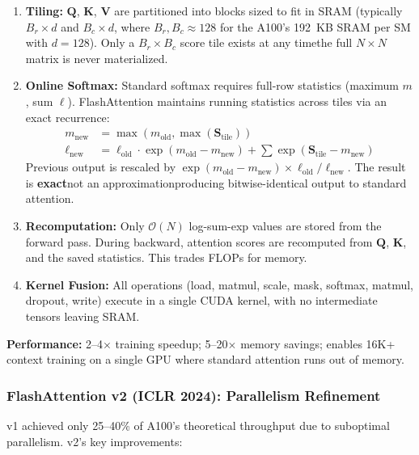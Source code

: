 \documentclass[11pt,a4paper]{article}
\begin{document}
\begin{enumerate}[leftmargin=*]
    \item \textbf{Tiling:} $\mathbf{Q}$, $\mathbf{K}$, $\mathbf{V}$ are partitioned into blocks sized to fit in SRAM (typically $B_r \times d$ and $B_c \times d$, where $B_r, B_c \approx 128$ for the A100's 192~KB SRAM per SM with $d = 128$). Only a $B_r \times B_c$ score tile exists at any time\textemdash the full $N \times N$ matrix is never materialized.

    \item \textbf{Online Softmax:} Standard softmax requires full-row statistics (maximum $m$, sum $\ell$). FlashAttention maintains running statistics across tiles via an exact recurrence:
    \begin{align*}
        m_{\text{new}} &= \max(m_{\text{old}}, \max(\mathbf{S}_{\text{tile}})) \\
        \ell_{\text{new}} &= \ell_{\text{old}} \cdot \exp(m_{\text{old}} - m_{\text{new}}) + \sum\exp(\mathbf{S}_{\text{tile}} - m_{\text{new}})
    \end{align*}
    Previous output is rescaled by $\exp(m_{\text{old}} - m_{\text{new}}) \times \ell_{\text{old}} / \ell_{\text{new}}$. The result is \textbf{exact}\textemdash not an approximation\textemdash producing bitwise-identical output to standard attention.

    \item \textbf{Recomputation:} Only $\mathcal{O}(N)$ log-sum-exp values are stored from the forward pass. During backward, attention scores are recomputed from $\mathbf{Q}$, $\mathbf{K}$, and the saved statistics. This trades FLOPs for memory.

    \item \textbf{Kernel Fusion:} All operations (load, matmul, scale, mask, softmax, matmul, dropout, write) execute in a single CUDA kernel, with no intermediate tensors leaving SRAM.
\end{enumerate}

\textbf{Performance:} 2--4$\times$ training speedup; 5--20$\times$ memory savings; enables 16K+ context training on a single GPU where standard attention runs out of memory.

\subsubsection{FlashAttention v2 (ICLR 2024): Parallelism Refinement}

v1 achieved only 25--40\% of A100's theoretical throughput due to suboptimal parallelism. v2's key improvements:
\end{document}
